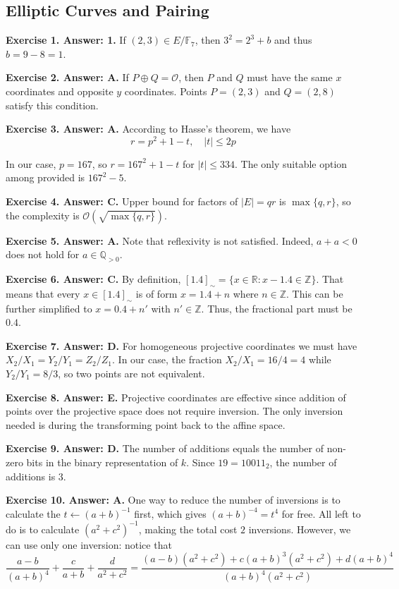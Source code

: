 \documentclass[../../book]{subfiles}
\begin{document}
\subsection*{Elliptic Curves and Pairing}

\textbf{Exercise 1. Answer: 1.} If $(2,3) \in E/\mathbb{F}_7$, then $3^2=2^3+b$ 
and thus $b=9-8=1$. 

\textbf{Exercise 2. Answer: A.} If $P\oplus Q=\mathcal{O}$, then $P$ and $Q$ must have 
the same $x$ coordinates and opposite $y$ coordinates. Points $P=(2,3)$ and 
$Q=(2,8)$ satisfy this condition.

\textbf{Exercise 3. Answer: A.} According to Hasse's theorem, we have
\begin{equation*}
    r = p^2 + 1 - t, \quad |t| \leq 2p
\end{equation*}

In our case, $p=167$, so $r=167^2 + 1 - t$ for $|t| \leq 334$. The only 
suitable option among provided is $167^2 - 5$.

\textbf{Exercise 4. Answer: C.} Upper bound for factors of $|E|=qr$ is
$\max\{q,r\}$, so the complexity is $\mathcal{O}(\sqrt{\max\{q,r\}})$.

\textbf{Exercise 5. Answer: A.} Note that reflexivity is not satisfied. Indeed,
$a+a<0$ does not hold for $a \in \mathbb{Q}_{>0}$.

\textbf{Exercise 6. Answer: C.} By definition, $[1.4]_{\sim} = \{x \in \mathbb{R}: x-1.4 \in \mathbb{Z}\}$. That means 
that every $x \in [1.4]_{\sim}$ is of form $x=1.4+n$ where $n \in \mathbb{Z}$. This can be 
further simplified to $x=0.4 + n'$ with $n' \in \mathbb{Z}$. Thus, the fractional part 
must be $0.4$.

\textbf{Exercise 7. Answer: D.} For homogeneous projective coordinates we must
have $X_2/X_1=Y_2/Y_1=Z_2/Z_1$. In our case, the fraction $X_2/X_1=16/4=4$ while
$Y_2/Y_1=8/3$, so two points are not equivalent.

\textbf{Exercise 8. Answer: E.} Projective coordinates are effective since 
addition of points over the projective space does not require inversion. The 
only inversion needed is during the transforming point back to the affine space.

\textbf{Exercise 9. Answer: D.} The number of additions equals the number of 
non-zero bits in the binary representation of $k$. Since $19=10011_2$, the number
of additions is $3$.

\textbf{Exercise 10. Answer: A.} One way to reduce the number of inversions 
is to calculate the $t \gets (a+b)^{-1}$ first, which gives $(a+b)^{-4}=t^4$
for free. All left to do is to calculate $(a^2+c^2)^{-1}$, making the 
total cost $2$ inversions. However, we can use only one inversion: notice 
that
\begin{equation*}
    \frac{a-b}{(a+b)^4} + \frac{c}{a+b} + \frac{d}{a^2+c^2} = \frac{(a-b)(a^2+c^2) + c(a+b)^3(a^2+c^2) + d(a+b)^4}{(a+b)^4(a^2+c^2)}
\end{equation*}
\end{document}
